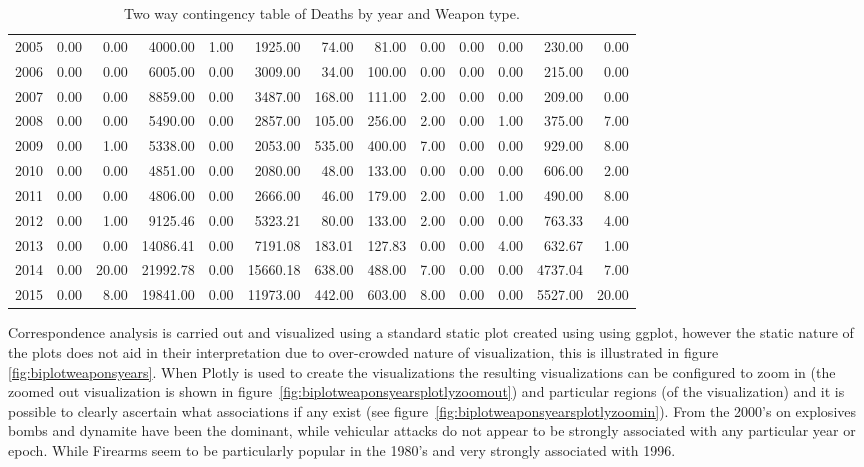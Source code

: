 \begin{table}
{\begin{tabular}{rrrrrrrrrrrrr}
  2005 & 0.00 & 0.00 & 4000.00 & 1.00 & 1925.00 & 74.00 & 81.00 & 0.00 & 0.00 & 0.00 & 230.00 & 0.00 \\ 
  2006 & 0.00 & 0.00 & 6005.00 & 0.00 & 3009.00 & 34.00 & 100.00 & 0.00 & 0.00 & 0.00 & 215.00 & 0.00 \\ 
  2007 & 0.00 & 0.00 & 8859.00 & 0.00 & 3487.00 & 168.00 & 111.00 & 2.00 & 0.00 & 0.00 & 209.00 & 0.00 \\ 
  2008 & 0.00 & 0.00 & 5490.00 & 0.00 & 2857.00 & 105.00 & 256.00 & 2.00 & 0.00 & 1.00 & 375.00 & 7.00 \\ 
  2009 & 0.00 & 1.00 & 5338.00 & 0.00 & 2053.00 & 535.00 & 400.00 & 7.00 & 0.00 & 0.00 & 929.00 & 8.00 \\ 
  2010 & 0.00 & 0.00 & 4851.00 & 0.00 & 2080.00 & 48.00 & 133.00 & 0.00 & 0.00 & 0.00 & 606.00 & 2.00 \\ 
  2011 & 0.00 & 0.00 & 4806.00 & 0.00 & 2666.00 & 46.00 & 179.00 & 2.00 & 0.00 & 1.00 & 490.00 & 8.00 \\ 
  2012 & 0.00 & 1.00 & 9125.46 & 0.00 & 5323.21 & 80.00 & 133.00 & 2.00 & 0.00 & 0.00 & 763.33 & 4.00 \\ 
  2013 & 0.00 & 0.00 & 14086.41 & 0.00 & 7191.08 & 183.01 & 127.83 & 0.00 & 0.00 & 4.00 & 632.67 & 1.00 \\ 
  2014 & 0.00 & 20.00 & 21992.78 & 0.00 & 15660.18 & 638.00 & 488.00 & 7.00 & 0.00 & 0.00 & 4737.04 & 7.00 \\ 
  2015 & 0.00 & 8.00 & 19841.00 & 0.00 & 11973.00 & 442.00 & 603.00 & 8.00 & 0.00 & 0.00 & 5527.00 & 20.00 \\ 
   \hline
\end{tabular}}
\caption{Two way contingency table of Deaths by year and Weapon type.}
\label{tab:weaponsyear}
\end{table}

Correspondence analysis is carried out and visualized using a standard static plot created using using ggplot, however the static nature of the plots does not aid in their interpretation due to over-crowded nature of visualization, this is illustrated in figure \ref{fig:biplotweaponsyears}. When Plotly is used to create the visualizations the resulting visualizations can be configured to zoom in (the zoomed out visualization is shown in figure~\ref{fig:biplotweaponsyearsplotlyzoomout}) and particular regions (of the visualization) and it is possible to clearly ascertain what associations if any exist (see figure~\ref{fig:biplotweaponsyearsplotlyzoomin}). From the 2000's on explosives bombs and dynamite have been the dominant, while vehicular attacks do not appear to be strongly associated with any particular year or epoch. While Firearms seem to be particularly popular  in the 1980's and very strongly associated with 1996.
 
